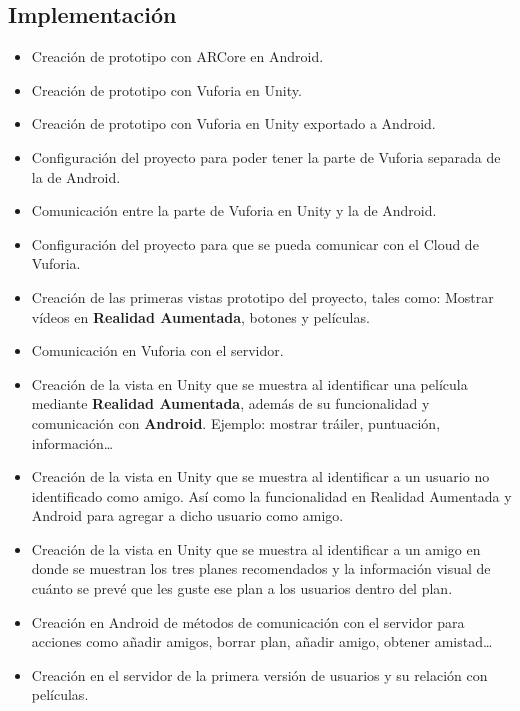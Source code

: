     \subsection{Implementación}
    \label{makereference7.3.3}
        \begin{itemize}  
            \item Creación de prototipo con ARCore en Android.
            \item Creación de prototipo con Vuforia en Unity.
            \item Creación de prototipo con Vuforia en Unity exportado a
             Android.
            \item Configuración del proyecto para poder tener la parte de
             Vuforia separada de la de Android.
            \item Comunicación entre la parte de Vuforia en Unity y la de
             Android.
            \item Configuración del proyecto para que se pueda comunicar con el
             Cloud de Vuforia.
            \item Creación de las primeras vistas prototipo del proyecto, tales
             como: Mostrar vídeos en \textbf{Realidad Aumentada}, botones y
             películas.
            \item Comunicación en Vuforia con el servidor.
            \item Creación de la vista en Unity que se muestra al identificar
             una película mediante \textbf{Realidad Aumentada}, además de su
             funcionalidad y comunicación con \textbf{Android}. Ejemplo: mostrar
             tráiler, puntuación, información…
            \item Creación de la vista en Unity que se muestra al identificar a
             un usuario no identificado como amigo. Así como la funcionalidad en
             Realidad Aumentada y Android para agregar a dicho usuario como
             amigo.
            \item Creación de la vista en Unity que se muestra al identificar a
             un amigo en donde se muestran los tres planes recomendados y la
             información visual de cuánto se prevé que les guste ese plan a los
             usuarios dentro del plan.
            \item Creación en Android de métodos de comunicación con el servidor
             para acciones como añadir amigos, borrar plan, añadir amigo,
             obtener amistad…
            \item Creación en el servidor de la primera versión de usuarios y su
             relación con películas.
        \end{itemize}
